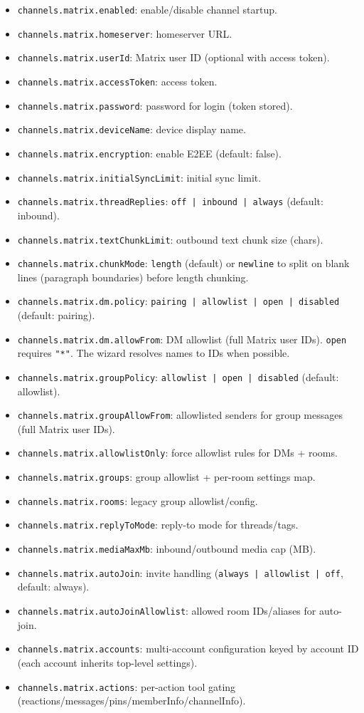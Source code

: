 \begin{itemize}
  \item \texttt{channels.matrix.enabled}: enable/disable channel startup.
  \item \texttt{channels.matrix.homeserver}: homeserver URL.
  \item \texttt{channels.matrix.userId}: Matrix user ID (optional with access token).
  \item \texttt{channels.matrix.accessToken}: access token.
  \item \texttt{channels.matrix.password}: password for login (token stored).
  \item \texttt{channels.matrix.deviceName}: device display name.
  \item \texttt{channels.matrix.encryption}: enable E2EE (default: false).
  \item \texttt{channels.matrix.initialSyncLimit}: initial sync limit.
  \item \texttt{channels.matrix.threadReplies}: \texttt{off | inbound | always} (default: inbound).
  \item \texttt{channels.matrix.textChunkLimit}: outbound text chunk size (chars).
  \item \texttt{channels.matrix.chunkMode}: \texttt{length} (default) or \texttt{newline} to split on blank lines (paragraph boundaries) before length chunking.
  \item \texttt{channels.matrix.dm.policy}: \texttt{pairing | allowlist | open | disabled} (default: pairing).
  \item \texttt{channels.matrix.dm.allowFrom}: DM allowlist (full Matrix user IDs). \texttt{open} requires \texttt{"*"}. The wizard resolves names to IDs when possible.
  \item \texttt{channels.matrix.groupPolicy}: \texttt{allowlist | open | disabled} (default: allowlist).
  \item \texttt{channels.matrix.groupAllowFrom}: allowlisted senders for group messages (full Matrix user IDs).
  \item \texttt{channels.matrix.allowlistOnly}: force allowlist rules for DMs + rooms.
  \item \texttt{channels.matrix.groups}: group allowlist + per-room settings map.
  \item \texttt{channels.matrix.rooms}: legacy group allowlist/config.
  \item \texttt{channels.matrix.replyToMode}: reply-to mode for threads/tags.
  \item \texttt{channels.matrix.mediaMaxMb}: inbound/outbound media cap (MB).
  \item \texttt{channels.matrix.autoJoin}: invite handling (\texttt{always | allowlist | off}, default: always).
  \item \texttt{channels.matrix.autoJoinAllowlist}: allowed room IDs/aliases for auto-join.
  \item \texttt{channels.matrix.accounts}: multi-account configuration keyed by account ID (each account inherits top-level settings).
  \item \texttt{channels.matrix.actions}: per-action tool gating (reactions/messages/pins/memberInfo/channelInfo).
\end{itemize}
